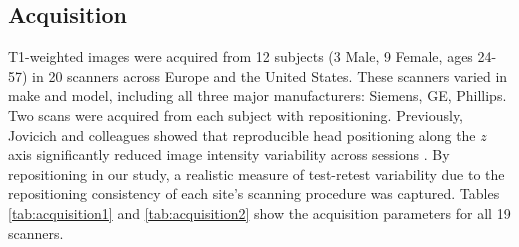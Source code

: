 \subsection{Acquisition}
T1-weighted images were acquired from 12 subjects (3 Male, 9 Female, ages 24-57) in 20 scanners across Europe and the United States. These scanners varied in make and model, including all three major manufacturers: Siemens, GE, Phillips. Two scans were acquired from each subject with repositioning. Previously, Jovicich and colleagues showed that reproducible head positioning along the $z$ axis significantly reduced image intensity variability across sessions \cite{freesurferReliability}. By repositioning in our study, a realistic measure of test-retest variability due to the repositioning consistency of each site's scanning procedure was captured. Tables \ref{tab:acquisition1} and \ref{tab:acquisition2} show the acquisition parameters for all 19 scanners.